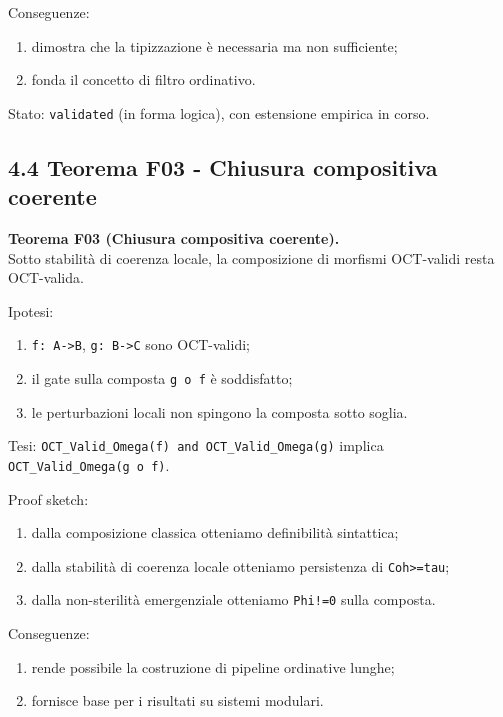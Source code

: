 Conseguenze:

\begin{enumerate}
\def\labelenumi{\arabic{enumi}.}
\tightlist
\item
  dimostra che la tipizzazione è necessaria ma non sufficiente;
\item
  fonda il concetto di filtro ordinativo.
\end{enumerate}

Stato: \texttt{validated} (in forma logica), con estensione empirica in corso.

\subsection{4.4 Teorema F03 - Chiusura compositiva coerente}

\textbf{Teorema F03 (Chiusura compositiva coerente).}\\
Sotto stabilità di coerenza locale, la composizione di morfismi OCT-validi resta OCT-valida.

Ipotesi:

\begin{enumerate}
\def\labelenumi{\arabic{enumi}.}
\tightlist
\item
  \texttt{f:\ A-\textgreater{}B}, \texttt{g:\ B-\textgreater{}C} sono OCT-validi;
\item
  il gate sulla composta \texttt{g\ o\ f} è soddisfatto;
\item
  le perturbazioni locali non spingono la composta sotto soglia.
\end{enumerate}

Tesi:
\texttt{OCT\_Valid\_Omega(f)\ and\ OCT\_Valid\_Omega(g)} implica \texttt{OCT\_Valid\_Omega(g\ o\ f)}.

Proof sketch:

\begin{enumerate}
\def\labelenumi{\arabic{enumi}.}
\tightlist
\item
  dalla composizione classica otteniamo definibilità sintattica;
\item
  dalla stabilità di coerenza locale otteniamo persistenza di \texttt{Coh\textgreater{}=tau};
\item
  dalla non-sterilità emergenziale otteniamo \texttt{Phi!=0} sulla composta.
\end{enumerate}

Conseguenze:

\begin{enumerate}
\def\labelenumi{\arabic{enumi}.}
\tightlist
\item
  rende possibile la costruzione di pipeline ordinative lunghe;
\item
  fornisce base per i risultati su sistemi modulari.
\end{enumerate}

